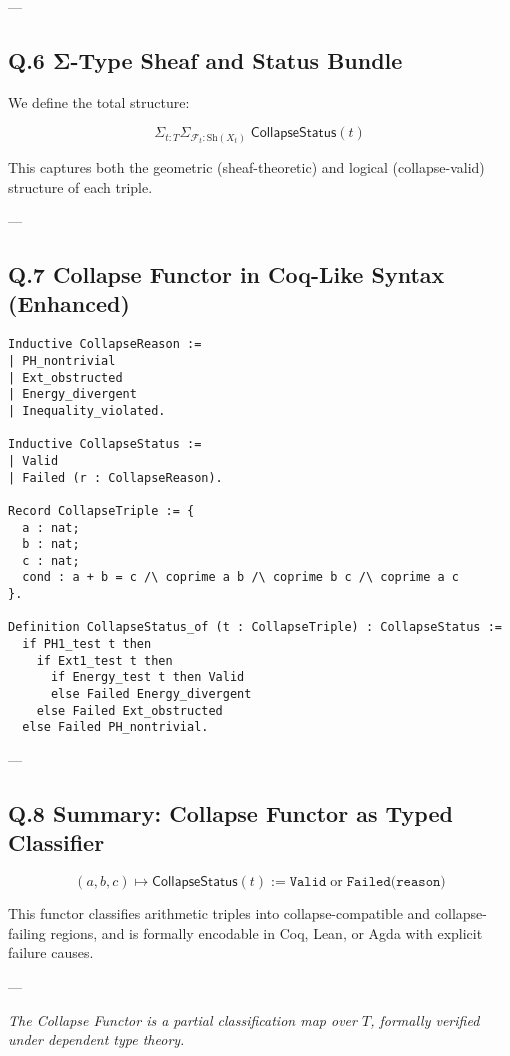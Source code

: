 \documentclass[11pt]{article}
\begin{document}
---

\subsection*{Q.6 Σ-Type Sheaf and Status Bundle}

We define the total structure:

\[
\Sigma_{t:T} \Sigma_{\mathcal{F}_t:\mathrm{Sh}(X_t)} \;
  \mathsf{CollapseStatus}(t)
\]

This captures both the geometric (sheaf-theoretic) and logical (collapse-valid) structure of each triple.

---

\subsection*{Q.7 Collapse Functor in Coq-Like Syntax (Enhanced)}

\begin{verbatim}
Inductive CollapseReason :=
| PH_nontrivial
| Ext_obstructed
| Energy_divergent
| Inequality_violated.

Inductive CollapseStatus :=
| Valid
| Failed (r : CollapseReason).

Record CollapseTriple := {
  a : nat;
  b : nat;
  c : nat;
  cond : a + b = c /\ coprime a b /\ coprime b c /\ coprime a c
}.

Definition CollapseStatus_of (t : CollapseTriple) : CollapseStatus :=
  if PH1_test t then
    if Ext1_test t then
      if Energy_test t then Valid
      else Failed Energy_divergent
    else Failed Ext_obstructed
  else Failed PH_nontrivial.
\end{verbatim}

---

\subsection*{Q.8 Summary: Collapse Functor as Typed Classifier}

\[
\boxed{
(a,b,c) \mapsto \mathsf{CollapseStatus}(t) := \texttt{Valid} \;\text{or}\; \texttt{Failed(reason)}
}
\]

This functor classifies arithmetic triples into collapse-compatible and collapse-failing regions,  
and is formally encodable in Coq, Lean, or Agda with explicit failure causes.

---

\begin{center}
\textit{The Collapse Functor is a partial classification map over \( T \), formally verified under dependent type theory.}
\end{center}
\end{document}
